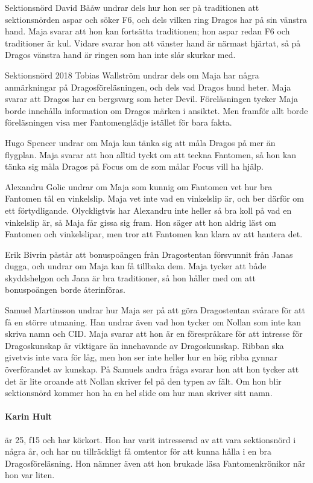 \documentclass[hidelinks]{sektionsmote}
\begin{document}
Sektionsnörd David Bååw undrar dels hur hon ser på traditionen att sektionsnörden aspar och söker F6, och dels vilken ring Dragos har på sin vänstra hand.
Maja svarar att hon kan fortsätta traditionen; hon aspar redan F6 och traditioner är kul.
Vidare svarar hon att vänster hand är närmast hjärtat, så på Dragos vänstra hand är ringen som han inte slår skurkar med.

Sektionsnörd 2018 Tobias Wallström undrar dels om Maja har några anmärkningar på Dragosföreläsningen, och dels vad Dragos hund heter.
Maja svarar att Dragos har en bergsvarg som heter Devil.
Föreläsningen tycker Maja borde innehålla information om Dragos märken i ansiktet.
Men framför allt borde föreläsningen visa mer Fantomenglädje istället för bara fakta.

Hugo Spencer undrar om Maja kan tänka sig att måla Dragos på mer än flygplan.
Maja svarar att hon alltid tyckt om att teckna Fantomen, så hon kan tänka sig måla Dragos på Focus om de som målar Focus vill ha hjälp.

Alexandru Golic undrar om Maja som kunnig om Fantomen vet hur bra Fantomen tål en vinkelslip.
Maja vet inte vad en vinkelslip är, och ber därför om ett förtydligande.
Olyckligtvis har Alexandru inte heller så bra koll på vad en vinkelslip är, så Maja får gissa sig fram.
Hon säger att hon aldrig läst om Fantomen och vinkelslipar, men tror att Fantomen kan klara av att hantera det.

Erik Bivrin påstår att bonuspoängen från Dragostentan försvunnit från Janas dugga, och undrar om Maja kan få tillbaka dem.
Maja tycker att både skyddshelgon och Jana är bra traditioner, så hon håller med om att bonuspoängen borde återinföras.

Samuel Martinsson undrar hur Maja ser på att göra Dragostentan svårare för att få en större utmaning.
Han undrar även vad hon tycker om Nollan som inte kan skriva namn och CID.
Maja svarar att hon är en förespråkare för att intresse för Dragoskunskap är viktigare än innehavande av Dragoskunskap.
Ribban ska givetvis inte vara för låg, men hon ser inte heller hur en hög ribba gynnar överförandet av kunskap.
På Samuels andra fråga svarar hon att hon tycker att det är lite oroande att Nollan skriver fel på den typen av fält.
Om hon blir sektionsnörd kommer hon ha en hel slide om hur man skriver sitt namn.

\paragraph{Karin Hult} är 25, f15 och har körkort.
Hon har varit intresserad av att vara sektionsnörd i några år, och har nu tillräckligt få omtentor för att kunna hålla i en bra Dragosföreläsning.
Hon nämner även att hon brukade läsa Fantomenkrönikor när hon var liten.
\end{document}

